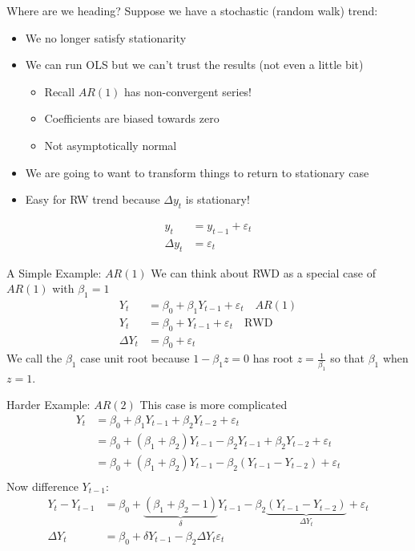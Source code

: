 \begin{frame}{Where are we heading?}
Suppose we have a stochastic (random walk) trend:
\begin{itemize}
\item We no longer satisfy \alert{stationarity}
\item We can run OLS but we can't trust the results (not even a little bit)
\begin{itemize}
    \item Recall $AR(1)$ has non-convergent series!
    \item Coefficients are biased towards zero
    \item Not asymptotically normal
\end{itemize}
\item We are going to want to transform things to return to stationary case
\item Easy for RW trend because $\Delta y_t$ is stationary!
\end{itemize}
\begin{align*}
y_t &= y_{t-1} + \varepsilon_t \\
\Delta y_t &= \varepsilon_t
\end{align*}
\end{frame}


\begin{frame}{A Simple Example: $AR(1)$}
We can think about RWD as a special case of $AR(1)$ with $\beta_1=1$
\begin{align*}
Y_t  &= \beta_0 +\beta_1 Y_{t-1} + \varepsilon_t \quad AR(1)\\
Y_t  &= \beta_0 + Y_{t-1} + \varepsilon_t \quad  \text{RWD} \\
\Delta Y_t  &= \beta_0 + \varepsilon_t 
\end{align*}
We call the $\beta_1$ case \alert{unit root} because $1 - \beta_1 z=0$ has root $z = \frac{1}{\beta_1}$ so that $\beta_1$ when $z=1$.
\end{frame}

\begin{frame}{Harder Example: $AR(2)$}
This case is more complicated
\begin{align*}
Y_t &= \beta_0 + \beta_1 Y_{t-1} + \beta_2 Y_{t-2} + \varepsilon_t\\
    &= \beta_0 + (\beta_1 + \beta_2) Y_{t-1} - \beta_2 Y_{t-1} +  \beta_2 Y_{t-2} + \varepsilon_t\\
    &= \beta_0 + (\beta_1 + \beta_2) Y_{t-1} - \beta_2(Y_{t-1} - Y_{t-2})+ \varepsilon_t\\
\end{align*}
Now difference $Y_{t-1}$:
\begin{align*}
Y_t -Y_{t-1}&= \beta_0 + \underbrace{(\beta_1 + \beta_2 -1)}_{\delta} Y_{t-1} - \beta_2 \underbrace{(Y_{t-1} - Y_{t-2})}_{\Delta Y_t}+ \varepsilon_t\\
\Delta Y_t &= \beta_0 + \delta Y_{t-1} - \beta_2 \Delta Y_t  \varepsilon_t\\
\end{align*}
\end{frame}



